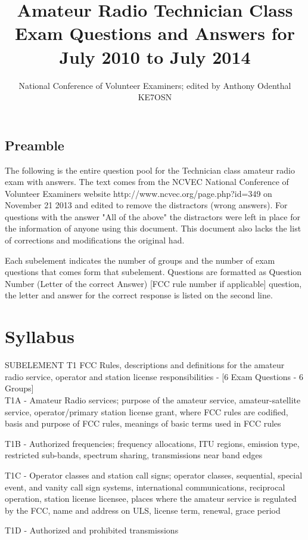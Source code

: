 \documentclass[12pt,letterpaper]{report}
\author{National Conference of Volunteer Examiners; edited by Anthony Odenthal KE7OSN}
\title{Amateur Radio Technician Class Exam Questions and Answers for July 2010 to July 2014}
\begin{document}
\maketitle
\section{Preamble}

The following is the entire question pool for the Technician class amateur radio exam with answers. The text comes from the NCVEC National Conference of Volunteer Examiners website http://www.ncvec.org/page.php?id=349 on November 21 2013 and edited to remove the distractors (wrong answers). For questions with the answer "All of the above" the distractors were left in place for the information of anyone using this document. This document also lacks the list of corrections and modifications the original had.

Each subelement indicates the number of groups and the number of exam questions that comes form that subelement. Questions are formatted as Question Number (Letter of the correct Answer) [FCC rule number if applicable] question, the letter and answer for the correct response is listed on the second line.

\tableofcontents
\chapter*{Syllabus}
SUBELEMENT T1   FCC Rules, descriptions and definitions for the amateur radio service, operator and station license responsibilities - [6 Exam Questions - 6 Groups]\\

T1A - Amateur Radio services; purpose of the amateur service, amateur-satellite service, operator/primary station license grant, where FCC rules are codified, basis and purpose of FCC rules, meanings of basic terms used in FCC rules

T1B - Authorized frequencies; frequency allocations, ITU regions, emission type, restricted sub-bands, spectrum sharing, transmissions near band edges

T1C - Operator classes and station call signs; operator classes, sequential, special event, and vanity call sign systems, international communications, reciprocal operation, station license licensee, places where the amateur service is regulated by the FCC, name and address on ULS, license term, renewal, grace period

T1D - Authorized and prohibited transmissions
\end{document}
